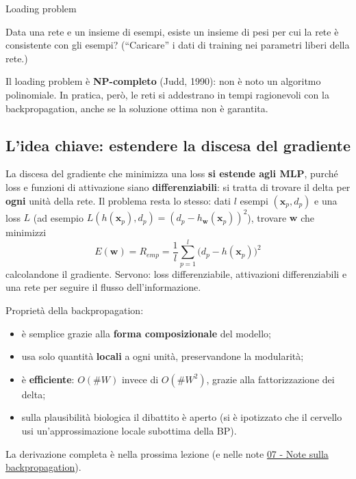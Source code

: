 \begin{boxdefinition}{Loading problem}

Data una rete e un insieme di esempi, esiste un insieme di pesi per cui
la rete è consistente con gli esempi? (``Caricare'' i dati di training
nei parametri liberi della rete.)

\end{boxdefinition}

Il loading problem è \textbf{NP-completo} (Judd, 1990): non è noto un
algoritmo polinomiale. In pratica, però, le reti si addestrano in tempi
ragionevoli con la backpropagation, anche se la soluzione ottima non è
garantita.

\subsection{L'idea chiave: estendere la discesa del
gradiente}\label{lidea-chiave-estendere-la-discesa-del-gradiente}

La discesa del gradiente che minimizza una loss \textbf{si estende agli
MLP}, purché loss e funzioni di attivazione siano
\textbf{differenziabili}: si tratta di trovare il delta per
\textbf{ogni} unità della rete. Il problema resta lo stesso: dati \(l\)
esempi \((\mathbf{x}_p, d_p)\) e una loss \(L\) (ad esempio
\(L(h(\mathbf{x}_p), d_p) = (d_p - h_\mathbf{w}(\mathbf{x}_p))^2\)),
trovare \(\mathbf{w}\) che minimizzi \[
E(\mathbf{w}) = R_{emp} = \frac{1}{l}\sum_{p=1}^{l}\big(d_p - h(\mathbf{x}_p)\big)^2
\] calcolandone il gradiente. Servono: loss differenziabile, attivazioni
differenziabili e una rete per seguire il flusso dell'informazione.

Proprietà della backpropagation:

\begin{itemize}
\tightlist
\item
  è semplice grazie alla \textbf{forma composizionale} del modello;
\item
  usa solo quantità \textbf{locali} a ogni unità, preservandone la
  modularità;
\item
  è \textbf{efficiente}: \(O(\#W)\) invece di \(O(\#W^2)\), grazie alla
  fattorizzazione dei delta;
\item
  sulla plausibilità biologica il dibattito è aperto (si è ipotizzato
  che il cervello usi un'approssimazione locale subottima della BP).
\end{itemize}

La derivazione completa è nella prossima lezione (e nelle note
\href{07\%20-\%20Note\%20sulla\%20backpropagation}{07 - Note sulla
backpropagation}).

